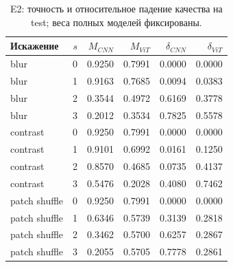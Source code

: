 \begin{table}[H]\centering\small
\setlength{\tabcolsep}{4pt}
\caption{E2: точность и относительное падение качества на test; веса полных моделей фиксированы.}\label{tab:e2}
\begin{tabular}{lrrrrr}
\toprule
Искажение & $s$ & $M_{CNN}$ & $M_{ViT}$ & $\delta_{CNN}$ & $\delta_{ViT}$ \\
\midrule
blur & 0 & 0.9250 & 0.7991 & 0.0000 & 0.0000 \\
blur & 1 & 0.9163 & 0.7685 & 0.0094 & 0.0383 \\
blur & 2 & 0.3544 & 0.4972 & 0.6169 & 0.3778 \\
blur & 3 & 0.2012 & 0.3534 & 0.7825 & 0.5578 \\
contrast & 0 & 0.9250 & 0.7991 & 0.0000 & 0.0000 \\
contrast & 1 & 0.9101 & 0.6992 & 0.0161 & 0.1250 \\
contrast & 2 & 0.8570 & 0.4685 & 0.0735 & 0.4137 \\
contrast & 3 & 0.5476 & 0.2028 & 0.4080 & 0.7462 \\
patch shuffle & 0 & 0.9250 & 0.7991 & 0.0000 & 0.0000 \\
patch shuffle & 1 & 0.6346 & 0.5739 & 0.3139 & 0.2818 \\
patch shuffle & 2 & 0.3462 & 0.5700 & 0.6257 & 0.2867 \\
patch shuffle & 3 & 0.2055 & 0.5705 & 0.7778 & 0.2861 \\
\bottomrule
\end{tabular}
\end{table}

